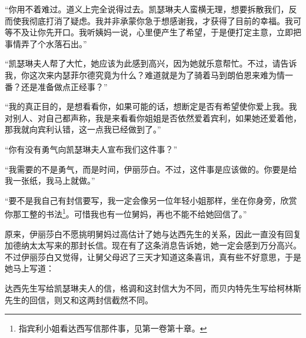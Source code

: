\par “你用不着难过。道义上完全说得过去。凯瑟琳夫人蛮横无理，想要拆散我们，反而使我彻底打消了疑虑。我并非承蒙你急于想感谢我，才获得了目前的幸福。我可等不及让你先开口。我听姨妈一说，心里便产生了希望，于是便打定主意，立即把事情弄了个水落石出。”
\par “凯瑟琳夫人帮了大忙，她应该为此感到高兴，因为她就乐意帮忙。不过，请告诉我，你这次来内瑟菲尔德究竟为什么？难道就是为了骑着马到朗伯恩来难为情一番？还是准备做点正经事？”
\par “我的真正目的，是想看看你，如果可能的话，想断定是否有希望使你爱上我。我对别人、对自己都声称，我是来看看你姐姐是否依然爱着宾利，如果她还爱着他，那我就向宾利认错，这一点我已经做到了。”
\par “你有没有勇气向凯瑟琳夫人宣布我们这件事？”
\par “我需要的不是勇气，而是时间，伊丽莎白。不过，这件事是应该做的。你要是给我一张纸，我马上就做。”
\par “要不是我自己有封信要写，我一定会像另一位年轻小姐那样，坐在你身旁，欣赏你那工整的书法\footnote{指宾利小姐看达西写信那件事，见第一卷第十章。}。可惜我也有一位舅妈，再也不能不给她回信了。”
\par 原来，伊丽莎白不愿挑明舅妈过高估计了她与达西先生的关系，因此一直没有回复加德纳太太写来的那封长信。现在有了这条消息告诉她，她一定会感到万分高兴。不过伊丽莎白又觉得，让舅父母迟了三天才知道这条喜讯，真有些不好意思，于是她马上写道：
\par 达西先生写给凯瑟琳夫人的信，格调和这封信大为不同，而贝内特先生写给柯林斯先生的回信，则又和这两封信截然不同。
